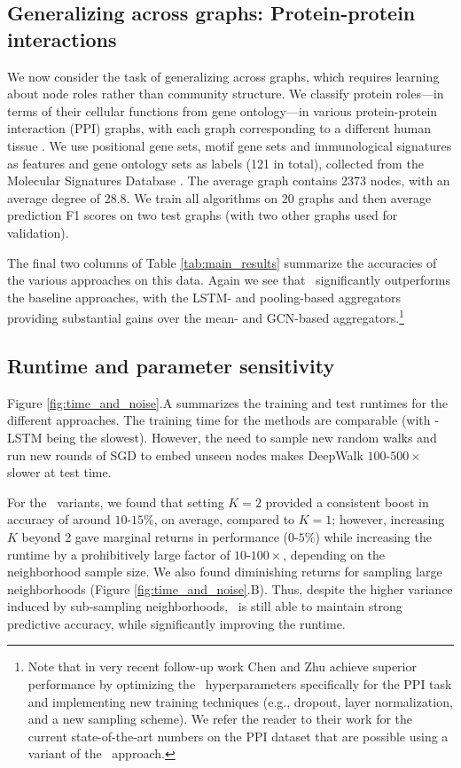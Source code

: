 \subsection{Generalizing across graphs: Protein-protein interactions}\label{inductive:sec:ppi}

We now consider the task of generalizing across graphs, which requires learning about node roles rather than community structure. 
We classify protein roles---in terms of their cellular functions from gene ontology---in various
protein-protein interaction (PPI) graphs, with each graph corresponding to a different human tissue \cite{zitnik2017tissue}.
We use positional gene sets, motif gene sets and immunological signatures as features and gene
ontology sets as labels (121 in total), collected from the Molecular Signatures Database \cite{subramanian2005gene}.
The average graph contains 2373 nodes, with an average degree of 28.8.
We train all algorithms on 20 graphs and then average prediction F1 scores on two test graphs (with two other graphs used for validation). 

The final two columns of Table \ref{tab:main_results} summarize the accuracies of the various approaches on this data.
Again we see that \name\ significantly outperforms the baseline approaches, with the LSTM- and pooling-based aggregators providing substantial gains over the mean- and GCN-based aggregators.\footnote{Note that in very recent follow-up work Chen and Zhu \cite{chen2017stochastic} achieve superior performance by optimizing the \name\ hyperparameters specifically for the PPI task and implementing new training techniques (e.g., dropout, layer normalization, and a new sampling scheme). We refer the reader to their work for the current state-of-the-art numbers on the PPI dataset that are possible using a variant of the \name\ approach.} 


\subsection{Runtime and parameter sensitivity}\label{inductive:sec:sensitivity}

Figure \ref{fig:time_and_noise}.A summarizes the training and test runtimes for the different approaches. 
The training time for the methods are comparable (with \name-LSTM being the slowest). 
However, the need to sample new random walks and run new rounds of SGD to embed unseen nodes makes DeepWalk $100\text{-}500\times$ slower at test time. 

For the \name\ variants, we found that setting $K=2$ provided a consistent boost in accuracy of around $10\text{-}15\%$, on average, compared
to $K=1$; however, increasing $K$ beyond 2 gave marginal returns in performance ($0\text{-}5\%$)
while increasing the runtime by a prohibitively large factor of $10\text{-}100{\times}$, depending
on the neighborhood sample size.
We also found diminishing returns for sampling large neighborhoods (Figure
\ref{fig:time_and_noise}.B).
Thus, despite
the higher variance induced by sub-sampling neighborhoods, \name\ is still able to maintain strong predictive accuracy, while significantly improving the runtime. 

